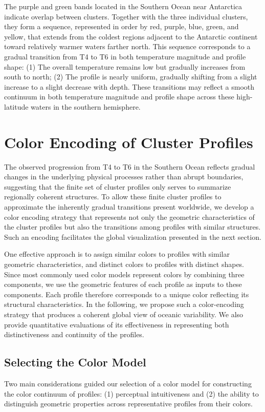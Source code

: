 \documentclass[11pt]{article}
\theoremstyle{plain}
\begin{document}
The purple and green bands located in the Southern Ocean near Antarctica indicate overlap between clusters. Together with the three individual clusters, they form a sequence, represented in order by red, purple, blue, green, and yellow, that extends from the coldest regions adjacent to the Antarctic continent toward relatively warmer waters farther north. This sequence corresponds to a gradual transition from T4 to T6 in both temperature magnitude and profile shape: (1) The overall temperature remains low but gradually increases from south to north; (2) The profile is nearly uniform, gradually shifting from a slight increase to a slight decrease with depth. These transitions may reflect a smooth continuum in both temperature magnitude and profile shape across these high-latitude waters in the southern hemisphere.


\section{Color Encoding of Cluster Profiles}
\label{sec:color}

The observed progression from T4 to T6 in the Southern Ocean reflects gradual changes in the underlying physical processes rather than abrupt boundaries, suggesting that the finite set of cluster profiles only serves to summarize regionally coherent structures. To allow these finite cluster profiles to approximate the inherently gradual transitions present worldwide, we develop a color encoding strategy that represents not only the geometric characteristics of the cluster profiles but also the transitions among profiles with similar structures. Such an encoding facilitates the global visualization presented in the next section.

One effective approach is to assign similar colors to profiles with similar geometric characteristics, and distinct colors to profiles with distinct shapes. Since most commonly used color models represent colors by combining three components, we use the geometric features of each profile as inputs to these components. Each profile therefore corresponds to a unique color reflecting its structural characteristics. In the following, we propose such a color-encoding strategy that produces a coherent global view of oceanic variability. We also provide quantitative evaluations of its effectiveness in representing both distinctiveness and continuity of the profiles.


\subsection{Selecting the Color Model}
Two main considerations guided our selection of a color model for constructing the color continuum of profiles: (1) perceptual intuitiveness and (2) the ability to distinguish geometric properties across representative profiles from their colors.
\end{document}
